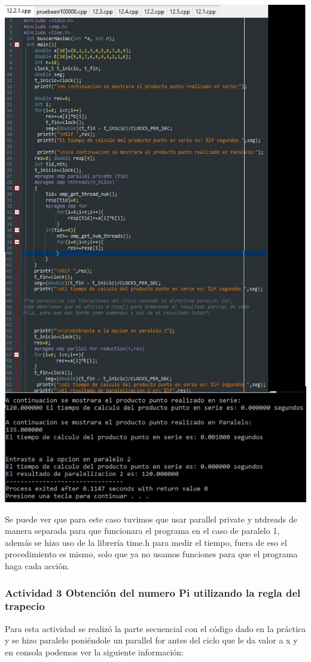 \documentclass[12pt,letterpaper]{article}
\begin{document}
\includegraphics[scale=.8]{15.jpg}

Se puede ver que para este caso tuvimos que usar parallel private  y ntdreads de manera separada para que funcionara el programa en el caso de paralelo 1, además se hizo uso de la librería time.h para medir el tiempo, fuera de eso el procedimiento es mismo, solo que ya no usamos funciones para que el programa haga cada acción.


\subsubsection*{Actividad 3 Obtención del numero Pi utilizando la regla del trapecio}
Para esta actividad se realizó la parte secuencial con el código dado en la práctica y se hizo paralelo poniéndole un parallel for  antes del ciclo que le da valor a x y en consola podemos ver la siguiente información: 
\end{document}
